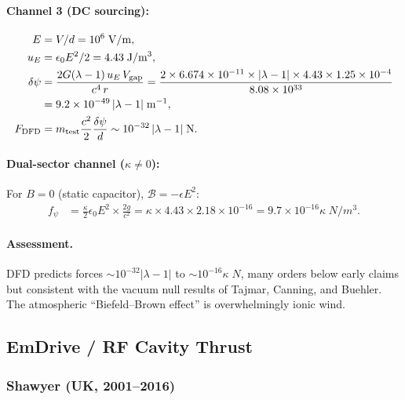 \documentclass[aps,prd,twocolumn,superscriptaddress,floatfix,nofootinbib]{revtex4-2}
\newcommand{\lam}{\lambda}
\newcommand{\kap}{\kappa}
\newcommand{\calB}{\mathcal{B}}
\begin{document}
\paragraph{Channel 3 (DC sourcing):}
\begin{align}
E &= V/d = 10^6\;\si{V/m}, \\
u_E &= \epsilon_0 E^2/2 = 4.43\;\si{J/m^3}, \\
\delta\psi &= \frac{2G(\lam-1)\,u_E\,V_{\rm gap}}{c^4\,r}
= \frac{2 \times 6.674\times10^{-11} \times |\lam-1| \times 4.43 \times 1.25\times10^{-4}}{8.08\times10^{33}} \notag\\
&= 9.2 \times 10^{-49}\,|\lam-1|\;\si{m^{-1}}, \\
F_{\rm DFD} &= m_{\rm test}\frac{c^2}{2}\frac{\delta\psi}{d}
\sim 10^{-32}\,|\lam-1|\;\si{N}.
\end{align}

\paragraph{Dual-sector channel ($\kappa \neq 0$):}
For $B = 0$ (static capacitor), $\calB = -\epsilon E^2$:
\begin{align}
f_\psi &= \frac{\kap}{2}\epsilon_0 E^2 \times
\frac{2g}{c^2} = \kap \times 4.43 \times 2.18\times10^{-16}
= 9.7\times10^{-16}\kap\;\si{N/m^3}.
\end{align}

\paragraph{Assessment.} DFD predicts forces $\sim 10^{-32}|\lam-1|$ to
$\sim 10^{-16}\kap\;\si{N}$, many orders below early claims but
consistent with the vacuum null results of Tajmar, Canning, and
Buehler. The atmospheric ``Biefeld--Brown effect'' is overwhelmingly
ionic wind.

\subsection{EmDrive / RF Cavity Thrust}\label{sec:emdrive}

\subsubsection{Shawyer (UK, 2001--2016)}
\end{document}
